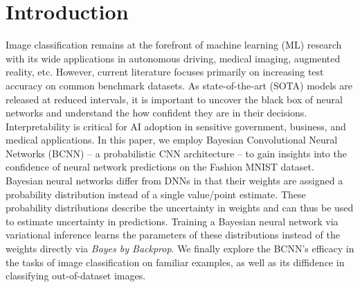 \section{Introduction}

Image classification remains at the forefront of machine learning (ML) research with its wide applications in autonomous driving, medical imaging, augmented reality, etc. However, current literature focuses primarily on increasing test accuracy on common benchmark datasets. As state-of-the-art (SOTA) models are released at reduced intervals, it is important to uncover the black box of neural networks and understand the how confident they are in their decisions. Interpretability is critical for AI adoption in sensitive government, business, and medical applications. In this paper, we employ Bayesian Convolutional Neural Networks (BCNN) – a probabilistic CNN architecture – to gain insights into the confidence of neural network predictions on the Fashion MNIST dataset. Bayesian neural networks differ from DNNs in that their weights are assigned a probability distribution instead of a single value/point estimate. These probability distributions describe the uncertainty in weights and can thus be used to estimate uncertainty in predictions. Training a Bayesian neural network via variational inference learns the parameters of these distributions instead of the weights directly via \textit{Bayes by Backprop}. We finally explore the BCNN's efficacy in the tasks of image classification on familiar examples, as well as its diffidence in classifying out-of-dataset images.

